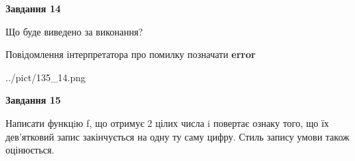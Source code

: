 \documentclass[11pt, ukrainian]{article}
\begin{document}
{\begin {large}
{\begin {center}\textbf{Завдання 14}\end {center}}\par
Що буде виведено за виконання? \par
Повідомлення інтерпретатора про помилку позначати \textbf{error}

\begin{center}
	{../pict/135_14.png}
\end{center}
\newpage

{\begin {center}\textbf{Завдання 15}\end {center}}\par

Написати функцiю f, що отримує 2 цілих числа i повертає ознаку того, що їх дев'ятковий запис закінчується на одну ту саму цифру. Стиль запису умови також оцінюється.\par
\newpage

\end {large}}
\end{document}
